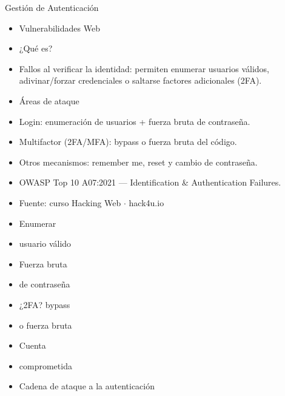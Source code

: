 \documentclass[aspectratio=169,10pt]{beamer}
\begin{document}
\begin{frame}[allowframebreaks]{Gestión de Autenticación}
\small
  \begin{itemize}
  \item Vulnerabilidades Web
  \item ¿Qué es?
  \item Fallos al verificar la identidad: permiten enumerar usuarios válidos, adivinar/forzar credenciales o saltarse factores adicionales (2FA).
  \item Áreas de ataque
  \item Login: enumeración de usuarios + fuerza bruta de contraseña.
  \item Multifactor (2FA/MFA): bypass o fuerza bruta del código.
  \item Otros mecanismos: remember me, reset y cambio de contraseña.
  \item OWASP Top 10 A07:2021 --- Identification \& Authentication Failures.
  \item Fuente: curso Hacking Web $\cdot$ hack4u.io
  \item Enumerar
  \item usuario válido
  \item Fuerza bruta
  \item de contraseña
  \item ¿2FA? bypass
  \item o fuerza bruta
  \item Cuenta
  \item comprometida
  \item Cadena de ataque a la autenticación
  \end{itemize}
\end{frame}
\end{document}

